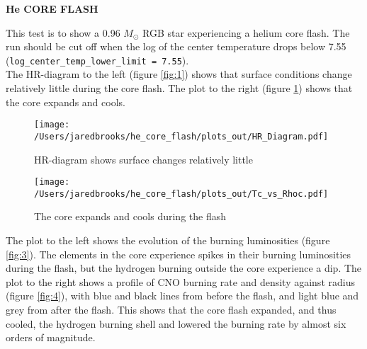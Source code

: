 \documentclass{article}
\begin{document}
	
	\begin{center}
	  \begin{Large}
	    \textbf{He CORE FLASH}\\
	  \end{Large}
	\end{center}

        This test is to show a 0.96 $M_\odot$ RGB star experiencing a helium core flash.  The run should be cut off when the log of the center temperature drops below 7.55 (\texttt{log\_center\_temp\_lower\_limit = 7.55}).\\

        The HR-diagram to the left (figure \ref{fig:1}) shows that surface conditions change relatively little during the core flash.  The plot to the right (figure \ref{fig:2}) shows that the core expands and cools.

        \begin{figure}[H]
          \begin{minipage}[b]{0.5\linewidth}
	    \centering
	    \texttt{[image: /Users/jaredbrooks/he\_core\_flash/plots\_out/HR\_Diagram.pdf]}
	    \caption{HR-diagram shows surface changes relatively little}
	    \label{fig:1}
          \end{minipage}
          \hspace{0cm}
          \begin{minipage}[b]{0.5\linewidth}
            \centering
            \texttt{[image: /Users/jaredbrooks/he\_core\_flash/plots\_out/Tc\_vs\_Rhoc.pdf]}
            \caption{The core expands and cools during the flash}
            \label{fig:2}
          \end{minipage}
	\end{figure}

        \pagebreak

        The plot to the left shows the evolution of the burning luminosities (figure \ref{fig:3}).  The elements in the core experience spikes in their burning luminosities during the flash, but the hydrogen burning outside the core experience a dip.  The plot to the right shows a profile of CNO burning rate and density against radius (figure \ref{fig:4}), with blue and black lines from before the flash, and light blue and grey from after the flash.  This shows that the core flash expanded, and thus cooled, the hydrogen burning shell and lowered the burning rate by almost six orders of magnitude.
\end{document}
